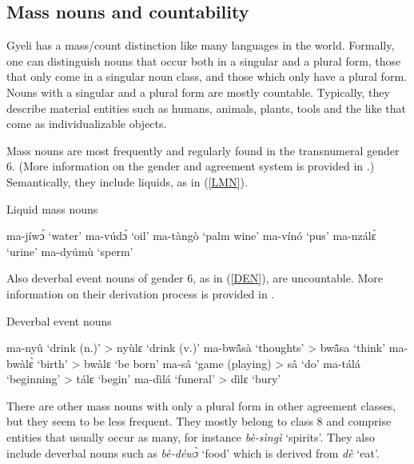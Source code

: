  


\subsection{Mass nouns and countability}
\label{sec:mass}

Gyeli has a mass/count distinction like many languages in the world. Formally, one can distinguish nouns that occur both in a singular and a plural form, those that only come in a singular noun class, and those which only have a plural form. Nouns with a singular and a plural form are mostly countable. Typically, they describe material entities such as humans, animals, plants, tools and the like that come as individualizable objects. 

Mass nouns are most frequently and regularly found in the transnumeral gender 6. (More information on the gender and agreement system is provided in .) Semantically, they include liquids, as in (\ref{LMN}). 

\begin{exe}
\ex\label{LMN} Liquid mass nouns
\begin{xlist}
\ex ma-jíwɔ́ `water' 
\ex ma-vúdɔ́ `oil'
\ex ma-tàngò `palm wine'
\ex ma-vínó `pus'
\ex ma-nzálɛ̀ `urine'
\ex ma-dyúmù `sperm' 
\end{xlist}
\end{exe}

\noindent Also deverbal event nouns of gender 6, as in (\ref{DEN}), are uncountable. More information on their derivation process is provided in .  

\begin{exe}
\ex\label{DEN} Deverbal event nouns
\begin{xlist}
\ex ma-nyû `drink (n.)' > nyùlɛ `drink (v.)'
\ex ma-bwã̂sà `thoughts' > bwã̂sa `think' 
\ex ma-bwàlɛ̀ `birth' > bwàlɛ `be born'
\ex ma-sâ `game (playing) > sâ `do'
\ex ma-tálá `beginning' > tálɛ `begin'
\ex ma-dìlá `funeral' > dìlɛ `bury'
\end{xlist}
\end{exe}

There are other mass nouns with only a plural form in other agreement classes, but they seem to be less frequent. They mostly belong to class 8 and comprise entities that usually occur as many, for instance {\itshape bè-sìngì} `spirits'. They also include deverbal nouns such as {\itshape bè-déwɔ̀} `food' which is derived from {\itshape dè} `eat'.

